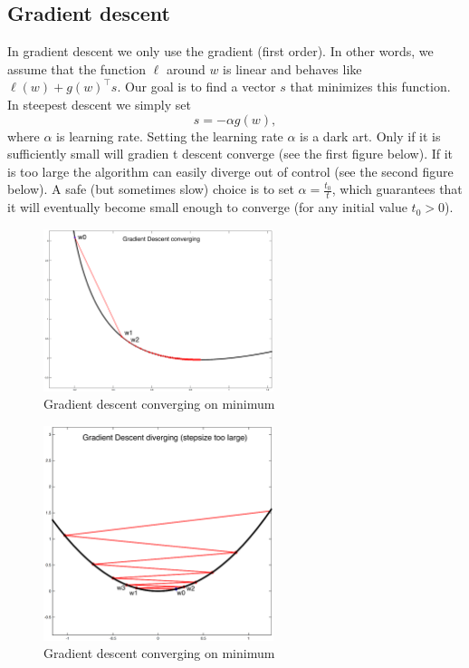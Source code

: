 \subsection{Gradient descent}
\FloatBarrier
In gradient descent we only use the gradient (first order). 
In other words, we assume that the function $\ell$ around $w$ is linear and behaves like 
$\ell(w)+g(w)^{\top}s$. Our goal is to find a vector $s$ that minimizes this function. 
In steepest descent we simply set
\begin{equation}
	\label{equ:delta_weights}
	s=-\alpha g(w),
\end{equation}
where $\alpha$ is learning rate.
Setting the learning rate $\alpha$ is a dark art. Only if it is sufficiently small will gradien
t descent converge (see the first figure below).
If it is too large the algorithm can easily diverge out of control (see the second figure below).
A safe (but sometimes slow) choice is to set $\alpha = \frac{t_{0}}{t}$, which guarantees that it
will eventually become small enough to converge (for any initial value $t_{0}>0$). 
\begin{figure}[htb] 
	\label{fig:gradient_converge}
	\centering
	\includegraphics[width=0.6\textwidth]{figures/gradient_converge}
	\caption{Gradient descent converging on minimum}
\end{figure}
\begin{figure}[htb] 
	\label{fig:gradient_skip}
	\centering
	\includegraphics[width=0.6\textwidth]{figures/gradient_skip}
	\caption{Gradient descent converging on minimum}
\end{figure}



